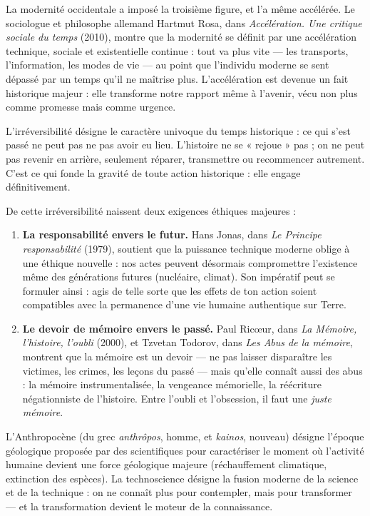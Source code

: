 \documentclass[11pt]{article}
\newcommand{\cle}[1]{{\popxbold\color{popdark}#1}}
\begin{document}
La modernité occidentale a imposé la troisième figure, et l'a même accélérée. Le sociologue et philosophe allemand Hartmut Rosa, dans \emph{Accélération. Une critique sociale du temps} (2010), montre que la modernité se définit par une accélération technique, sociale et existentielle continue : tout va plus vite — les transports, l'information, les modes de vie — au point que l'individu moderne se sent dépassé par un temps qu'il ne maîtrise plus. L'accélération est devenue un fait historique majeur : elle transforme notre rapport même à l'avenir, vécu non plus comme promesse mais comme urgence.

\begin{definition}[Irréversibilité]
L'\cle{irréversibilité} désigne le caractère univoque du temps historique : ce qui s'est passé ne peut pas ne pas avoir eu lieu. L'histoire ne se « rejoue » pas ; on ne peut pas revenir en arrière, seulement réparer, transmettre ou recommencer autrement. C'est ce qui fonde la gravité de toute action historique : elle engage définitivement.
\end{definition}

De cette irréversibilité naissent deux exigences éthiques majeures :

\begin{enumerate}
\item \textbf{La responsabilité envers le futur.} Hans Jonas, dans \emph{Le Principe responsabilité} (1979), soutient que la puissance technique moderne oblige à une éthique nouvelle : nos actes peuvent désormais compromettre l'existence même des générations futures (nucléaire, climat). Son impératif peut se formuler ainsi : agis de telle sorte que les effets de ton action soient compatibles avec la permanence d'une vie humaine authentique sur Terre.
\item \textbf{Le devoir de mémoire envers le passé.} Paul Ricœur, dans \emph{La Mémoire, l'histoire, l'oubli} (2000), et Tzvetan Todorov, dans \emph{Les Abus de la mémoire}, montrent que la mémoire est un devoir — ne pas laisser disparaître les victimes, les crimes, les leçons du passé — mais qu'elle connaît aussi des abus : la mémoire instrumentalisée, la vengeance mémorielle, la réécriture négationniste de l'histoire. Entre l'oubli et l'obsession, il faut une \emph{juste mémoire}.
\end{enumerate}

\begin{definition}
L'\cle{Anthropocène} (du grec \emph{anthrôpos}, homme, et \emph{kainos}, nouveau) désigne l'époque géologique proposée par des scientifiques pour caractériser le moment où l'activité humaine devient une force géologique majeure (réchauffement climatique, extinction des espèces). La \cle{technoscience} désigne la fusion moderne de la science et de la technique : on ne connaît plus pour contempler, mais pour transformer — et la transformation devient le moteur de la connaissance.
\end{definition}
\end{document}
